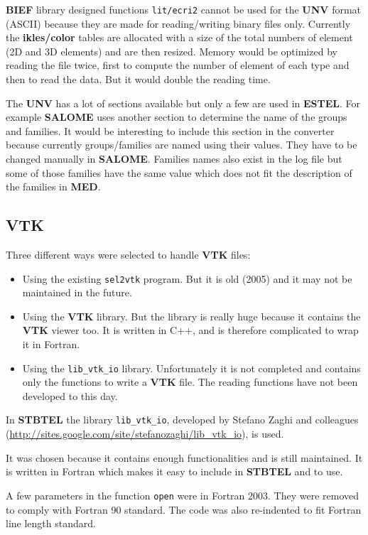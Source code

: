 \documentclass[a4paper,10pt]{article}
\newcommand{\stb}{\textbf{STBTEL}\xspace}
\newcommand{\bief}{\textbf{BIEF}\xspace}
\newcommand{\estel}{\textbf{ESTEL}\xspace}
\newcommand{\sal}{\textbf{SALOME}\xspace}
\newcommand{\unv}{\textbf{UNV}\xspace}
\newcommand{\med}{\textbf{MED}\xspace}
\newcommand{\vtk}{\textbf{VTK}\xspace}
\begin{document}
\bief library designed functions \verb+lit/ecri2+ cannot be used for the \unv
format (ASCII) because they are made for reading/writing binary files only.
Currently the \textbf{ikles/color} tables are allocated with a size of the
total numbers of element (2D and 3D elements) and are then resized.  Memory
would be optimized by reading the file twice, first to compute the number of
element of each type and then to read the data. But it would double the reading
time.

The \unv has a lot of sections available but only a few are used in \estel. For
example \sal uses another section to determine the name of the groups and
families.  It would be interesting to include this section in the converter
because currently groups/families are named using their values. They have to be
changed manually in \sal. Families names also exist in the log file but some of
those families have the same value which does not fit the description of the
families in \med.

\subsection{\vtk}

Three different ways were selected to handle \vtk files:

\begin{itemize}
\item Using the existing \verb+sel2vtk+ program. But it is old (2005) and it
may not be maintained in the future.
\item Using the \vtk library. But the library is really huge because it
contains the \vtk viewer too.  It is written in C++, and is therefore
complicated to wrap it in Fortran.
\item Using the \verb+lib_vtk_io+ library. Unfortunately it is not completed
and contains only the functions to write a \vtk file.  The reading functions
have not been developed to this day.
\end{itemize}

In \stb the library \verb+lib_vtk_io+, developed by Stefano Zaghi and colleagues
(\url{http://sites.google.com/site/stefanozaghi/lib\_vtk\_io}), is used.

It was chosen because it contains enough functionalities and is still
maintained.  It is written in Fortran which makes it easy to include in \stb
and to use.

A few parameters in the function \verb+open+ were in Fortran 2003. They were
removed to comply with Fortran 90 standard. The code was also re-indented to
fit Fortran line length standard.
\end{document}
